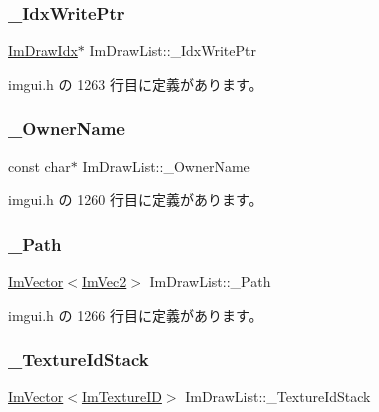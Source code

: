 \subsubsection{\texorpdfstring{\+\_\+\+Idx\+Write\+Ptr}{\_IdxWritePtr}}
{\footnotesize\ttfamily \mbox{\hyperlink{imgui_8h_afdc8744a5ac1a968b1ddfa47e13b2fa1}{Im\+Draw\+Idx}}$\ast$ Im\+Draw\+List\+::\+\_\+\+Idx\+Write\+Ptr}



 imgui.\+h の 1263 行目に定義があります。

\mbox{\label{struct_im_draw_list_a643f385fb9d5fc35a431e72a10a212f5}} 
\subsubsection{\texorpdfstring{\+\_\+\+Owner\+Name}{\_OwnerName}}
{\footnotesize\ttfamily const char$\ast$ Im\+Draw\+List\+::\+\_\+\+Owner\+Name}



 imgui.\+h の 1260 行目に定義があります。

\mbox{\label{struct_im_draw_list_a5bdc39abf351360500048628b8dc1b07}} 
\subsubsection{\texorpdfstring{\+\_\+\+Path}{\_Path}}
{\footnotesize\ttfamily \mbox{\hyperlink{class_im_vector}{Im\+Vector}}$<$\mbox{\hyperlink{struct_im_vec2}{Im\+Vec2}}$>$ Im\+Draw\+List\+::\+\_\+\+Path}



 imgui.\+h の 1266 行目に定義があります。

\mbox{\label{struct_im_draw_list_a848faddd121da050214b8d8159e5e704}} 
\subsubsection{\texorpdfstring{\+\_\+\+Texture\+Id\+Stack}{\_TextureIdStack}}
{\footnotesize\ttfamily \mbox{\hyperlink{class_im_vector}{Im\+Vector}}$<$\mbox{\hyperlink{imgui_8h_a364f4447ecbc4ca176145ccff9db6286}{Im\+Texture\+ID}}$>$ Im\+Draw\+List\+::\+\_\+\+Texture\+Id\+Stack}



